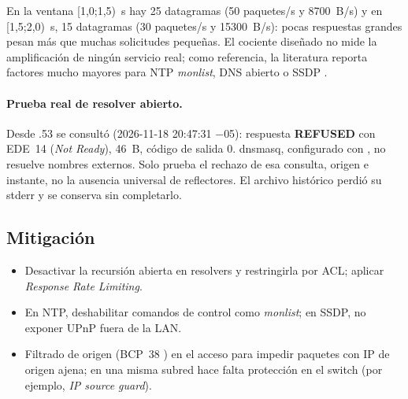 
En la ventana [1,0;1,5)~s hay 25 datagramas (50 paquetes/s y 8700~B/s) y en [1,5;2,0)~s, 15 datagramas (30 paquetes/s y 15300~B/s): pocas respuestas grandes pesan más que muchas solicitudes pequeñas. El cociente diseñado no mide la amplificación de ningún servicio real; como referencia, la literatura reporta factores mucho mayores para NTP \emph{monlist}, DNS abierto o SSDP \cite{rossow2014}.

\paragraph{Prueba real de resolver abierto.} Desde .53 se consultó  (2026-11-18 20:47:31 $-$05): respuesta \textbf{REFUSED} con EDE~14 (\emph{Not Ready}), 46~B, código de salida 0. dnsmasq, configurado con , no resuelve nombres externos. Solo prueba el rechazo de esa consulta, origen e instante, no la ausencia universal de reflectores. El archivo histórico perdió su stderr y se conserva sin completarlo.

\subsection{Mitigación}
\begin{itemize}
\item Desactivar la recursión abierta en resolvers y restringirla por ACL; aplicar \emph{Response Rate Limiting}.
\item En NTP, deshabilitar comandos de control como \emph{monlist}; en SSDP, no exponer UPnP fuera de la LAN.
\item Filtrado de origen (BCP~38 \cite{bcp38}) en el acceso para impedir paquetes con IP de origen ajena; en una misma subred hace falta protección en el switch (por ejemplo, \emph{IP source guard}).
\end{itemize}

